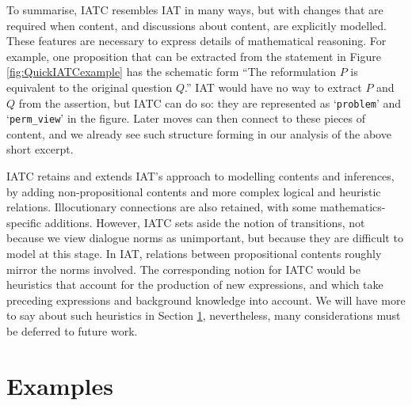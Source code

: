 \documentclass[smallextended,oneside]{svjour3}       %
\newcommand\nothing[1]{#1}
\let\paragraph\nothing
\begin{document}
\paragraph{To summarise, IATC resembles IAT in many ways, but with changes
that are required when content, and discussions about content, are explicitly modelled.}
These features are necessary to express details of mathematical reasoning.
For example, one proposition that can be extracted from the statement in
Figure \ref{fig:QuickIATCexample} has the schematic form ``The reformulation $P$ is equivalent to the original question $Q$.''  IAT would have no way to extract $P$ and $Q$ 
from the assertion, but IATC can do so: they are
represented as `\texttt{problem}' and `\texttt{perm\_view}' in the figure.
Later moves can then connect to these pieces of content, and we
already see such structure forming in our analysis of the above short excerpt.

IATC retains and extends IAT's approach to modelling contents and
inferences, by adding non-propositional contents and more complex
logical and heuristic relations.  Illocutionary connections are also
retained, with some mathematics-specific additions.  However, IATC
sets aside the notion of transitions, not because we view dialogue
norms as unimportant, but because they are difficult to model at this
stage.  In IAT, relations between propositional contents roughly
mirror the norms involved.  The corresponding notion for IATC would be
heuristics that account for the production of new expressions, and
which take preceding expressions and background knowledge into
account.  We will have more to say about such heuristics in Section
\ref{iatc-examples}, nevertheless, many considerations must be
deferred to future work.

\section{Examples}\label{iatc-examples}
\end{document}
